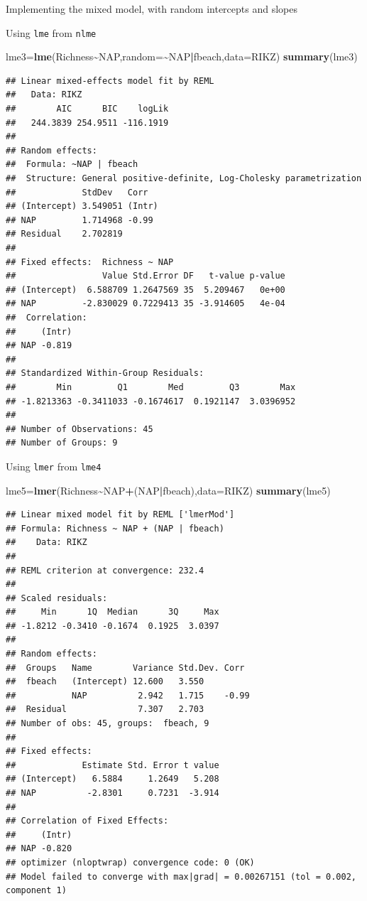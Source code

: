 \documentclass[
]{book}
\newenvironment{Shaded}{\begin{snugshade}}{\end{snugshade}}
\newcommand{\AttributeTok}[1]{\textcolor[rgb]{0.13,0.29,0.53}{#1}}
\newcommand{\FunctionTok}[1]{\textcolor[rgb]{0.13,0.29,0.53}{\textbf{#1}}}
\newcommand{\NormalTok}[1]{#1}
\newcommand{\OtherTok}[1]{\textcolor[rgb]{0.56,0.35,0.01}{#1}}
\newcommand{\SpecialCharTok}[1]{\textcolor[rgb]{0.81,0.36,0.00}{\textbf{#1}}}
\begin{document}
Implementing the mixed model, with random intercepts and slopes

Using \texttt{lme} from \texttt{nlme}

\begin{Shaded}
\begin{Highlighting}[]
\NormalTok{lme3}\OtherTok{=}\FunctionTok{lme}\NormalTok{(Richness}\SpecialCharTok{\textasciitilde{}}\NormalTok{NAP,}\AttributeTok{random=}\SpecialCharTok{\textasciitilde{}}\NormalTok{NAP}\SpecialCharTok{|}\NormalTok{fbeach,}\AttributeTok{data=}\NormalTok{RIKZ)}
\FunctionTok{summary}\NormalTok{(lme3)}
\end{Highlighting}
\end{Shaded}

\begin{verbatim}
## Linear mixed-effects model fit by REML
##   Data: RIKZ 
##        AIC      BIC    logLik
##   244.3839 254.9511 -116.1919
## 
## Random effects:
##  Formula: ~NAP | fbeach
##  Structure: General positive-definite, Log-Cholesky parametrization
##             StdDev   Corr  
## (Intercept) 3.549051 (Intr)
## NAP         1.714968 -0.99 
## Residual    2.702819       
## 
## Fixed effects:  Richness ~ NAP 
##                 Value Std.Error DF   t-value p-value
## (Intercept)  6.588709 1.2647569 35  5.209467   0e+00
## NAP         -2.830029 0.7229413 35 -3.914605   4e-04
##  Correlation: 
##     (Intr)
## NAP -0.819
## 
## Standardized Within-Group Residuals:
##        Min         Q1        Med         Q3        Max 
## -1.8213363 -0.3411033 -0.1674617  0.1921147  3.0396952 
## 
## Number of Observations: 45
## Number of Groups: 9
\end{verbatim}

Using \texttt{lmer} from \texttt{lme4}

\begin{Shaded}
\begin{Highlighting}[]
\NormalTok{lme5}\OtherTok{=}\FunctionTok{lmer}\NormalTok{(Richness}\SpecialCharTok{\textasciitilde{}}\NormalTok{NAP}\SpecialCharTok{+}\NormalTok{(NAP}\SpecialCharTok{|}\NormalTok{fbeach),}\AttributeTok{data=}\NormalTok{RIKZ)}
\FunctionTok{summary}\NormalTok{(lme5)}
\end{Highlighting}
\end{Shaded}

\begin{verbatim}
## Linear mixed model fit by REML ['lmerMod']
## Formula: Richness ~ NAP + (NAP | fbeach)
##    Data: RIKZ
## 
## REML criterion at convergence: 232.4
## 
## Scaled residuals: 
##     Min      1Q  Median      3Q     Max 
## -1.8212 -0.3410 -0.1674  0.1925  3.0397 
## 
## Random effects:
##  Groups   Name        Variance Std.Dev. Corr 
##  fbeach   (Intercept) 12.600   3.550         
##           NAP          2.942   1.715    -0.99
##  Residual              7.307   2.703         
## Number of obs: 45, groups:  fbeach, 9
## 
## Fixed effects:
##             Estimate Std. Error t value
## (Intercept)   6.5884     1.2649   5.208
## NAP          -2.8301     0.7231  -3.914
## 
## Correlation of Fixed Effects:
##     (Intr)
## NAP -0.820
## optimizer (nloptwrap) convergence code: 0 (OK)
## Model failed to converge with max|grad| = 0.00267151 (tol = 0.002, component 1)
\end{verbatim}
\end{document}
